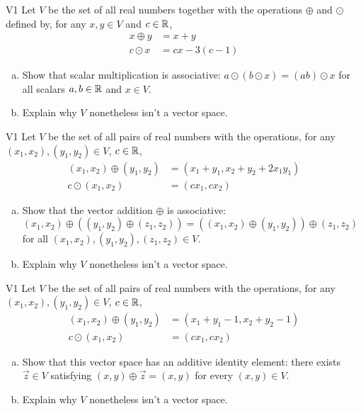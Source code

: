 \begin{problem}{V1}
Let \(V\) be the  set of all real numbers together with the operations \(\oplus\) and \(\odot\) defined by, for any \(x,y\in V\) and \(c\in \mathbb{R}\),
\begin{align*}
x\oplus y  &= x+y \\
c \odot x &= cx-3(c-1)
\end{align*}
\begin{enumerate}[(a)]
\item Show that scalar multiplication is associative: 
      \(a\odot(b\odot x)=(ab)\odot x\) for all scalars \(a,b \in \mathbb{R}\) and \(x \in V\).
\item Explain why \(V\) nonetheless isn't a vector space.
\end{enumerate}
\end{problem}


\begin{problem}{V1}
Let \(V\) be the set of all pairs of real numbers with the operations, for any \((x_1,x_2), (y_1,y_2) \in V\), \(c\in \mathbb{R}\),
\begin{align*}
(x_1,x_2) \oplus (y_1,y_2) &= (x_1+y_1,x_2+y_2+2x_1y_1) \\
c \odot (x_1,x_2) &= (cx_1, cx_2)
\end{align*}
\begin{enumerate}[(a)]
\item Show that the vector addition \(\oplus\) is associative:
      \((x_1,x_2) \oplus ((y_1,y_2) \oplus (z_1,z_2))=((x_1,x_2)\oplus (y_1,y_2))\oplus (z_1,z_2)\) for all \((x_1,x_2), (y_1,y_2), (z_1,z_2) \in V\).
\item Explain why \(V\) nonetheless isn't a vector space.
\end{enumerate}
\end{problem}



\begin{problem}{V1}
Let \(V\) be the set of all pairs of real numbers with the operations, for any \((x_1,x_2), (y_1,y_2) \in V\), \(c\in \mathbb{R}\),
\begin{align*}
(x_1,x_2) \oplus (y_1,y_2) &= (x_1+y_1-1,x_2+y_2-1) \\
c \odot (x_1,x_2) &= (cx_1, cx_2)
\end{align*}
\begin{enumerate}[(a)]
\item Show that this vector space has an additive identity element:
      there exists \(\vec{z} \in V\) satisfying \((x,y)\oplus\vec{z}=(x,y)\) for every \((x,y) \in V\).
\item Explain why \(V\) nonetheless isn't a vector space.
\end{enumerate}
\end{problem}

